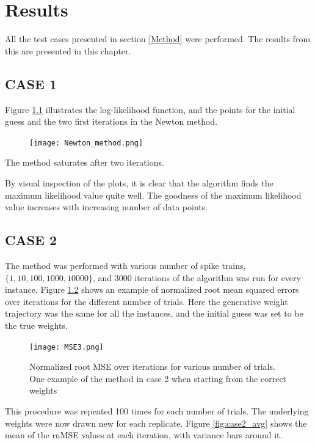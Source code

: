 
\chapter{Results}

All the test cases presented in section \ref{Method} were performed. The results from this are presented in this chapter.

\section{CASE 1}
Figure \ref{fig:Newton} illustrates the log-likelihood function, and the points for the initial guess and the two first iterations in the Newton method.


\begin{figure}[hbt!]
\caption{}
\label{fig:Newton}
    \centering
    \texttt{[image: Newton\_method.png]}
\end{figure}

The method saturates after two iterations. 

By visual inspection of the plots, it is clear that the algorithm finds the maximum likelihood value quite well. The goodness of the maximum likelihood value increases with increasing number of data points.  

\section{CASE 2}
 
The method was performed with various number of spike trains, $ \{1,10,100,1000,10000 \}$, and 3000 iterations of the algorithm was run for every instance. Figure \ref{fig:Case2_1} shows an example of normalized root mean squared errors over iterations for the different number of trials. Here the generative weight trajectory was the same for all the instances, and the initial guess was set to be the true weights. 


\begin{figure}[hbt!]
\caption{Normalized root MSE over iterations for various number of trials. One example of the method in case 2 when starting from the correct weights}
\label{fig:Case2_1}
    \centering
    \texttt{[image: MSE3.png]}
\end{figure}

This procedure was repeated 100 times for each number of trials. The underlying weights were now drawn new for each replicate. Figure \ref{fig:case2_avg} shows the mean of the rnMSE values at each iteration, with variance bars around it. 

